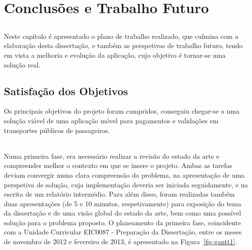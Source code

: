 \chapter{Conclusões e Trabalho Futuro} \label{chap:concl}

\section*{}

Neste capítulo é apresentado o plano de trabalho realizado, que culmina com a elaboração desta dissertação, e também as perspetivas de trabalho futuro, tendo em vista a melhoria e evolução da aplicação, cujo objetivo é tornar-se uma solução real.

\section{Satisfação dos Objetivos}

Os principais objetivos do projeto foram cumpridos, conseguiu chegar-se a uma solução viável de uma aplicação móvel para pagamentos e validações em transportes públicos de passageiros. 

~\\Numa primeira fase, era necessário realizar a revisão do estado da arte e compreender melhor o contexto em que se insere o projeto. Ambas as tarefas deviam convergir numa clara compreensão do problema, na apresentação de uma perspetiva de solução, cuja implementação deveria ser iniciada seguidamente, e na escrita de um relatório intermédio. Para além disso, foram realizadas também duas apresentações (de 5 e 10 minutos, respetivamente) para exposição do tema da dissertação e de uma visão global do estado da arte, bem como uma possível solução para o problema proposto. O planeamento da primeira fase, coincidente com a Unidade Curricular EIC0087 - Preparação da Dissertação,  entre os meses de novembro de 2012 e fevereiro de 2013, é apresentado na Figura~\ref{fig:gantt1}.

